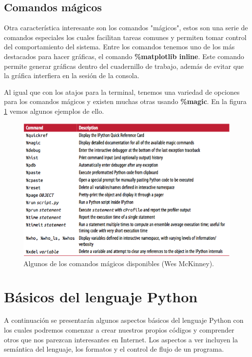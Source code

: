 \documentclass[a4paper]{article}
\begin{document}
\subsection{Comandos mágicos}

Otra característica interesante son los comandos "mágicos", estos son una serie de comandos especiales los cuales facilitan tareas comunes y permiten tomar control del comportamiento del sistema. Entre los comandos tenemos uno de los más destacados para hacer gráficas, el comando \textbf{\%matplotlib inline}. Este comando permite generar gráficas dentro del cuadernillo de trabajo, además de evitar que la gráfica interfiera en la sesión de la consola.

Al igual que con los atajos para la terminal, tenemos una variedad de opciones para los comandos mágicos y existen muchas otras usando \textbf{\%magic}. En la figura \ref{fig:magic} vemos algunos ejemplos de ello.


\begin{figure}[h!]
	\center
	\includegraphics[scale=.35]{./Images/Magic_Table}
	\caption{\label{fig:magic}Algunos de los comandos mágicos disponibles (Wes McKinney).}
\end{figure}

\section{Básicos del lenguaje Python}

A continuación se presentarán algunos aspectos básicos del lenguaje Python con los cuales podremos comenzar a crear nuestros propios códigos y comprender otros que nos parezcan interesantes en Internet. Los aspectos a ver incluyen la semántica del lenguaje, los formatos y el control de flujo de un programa.
\end{document}
